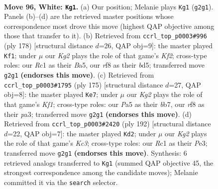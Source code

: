 \documentclass[11pt]{article}
\begin{document}
\clearpage

\begin{figure}[p]\centering
\begin{subfigure}{0.46\textwidth}\centering
\resizebox{\linewidth}{!}{%
\newchessgame
\chessboard[
  setfen={5r2/8/p7/P1pk1p1p/1p3P1P/4P1P1/1P4K1/2R5 w - - 3 96},
  showmover=false,
  pgfstyle=straightmove, color=movearrow, markmove={g2-g1}
]}
\caption{}
\end{subfigure}\hfill
\begin{subfigure}{0.46\textwidth}\centering
\resizebox{\linewidth}{!}{%
\newchessgame
\chessboard[
  setfen={8/4k3/5p2/B2b1Pp1/3Pp1Pp/4P2P/5K2/8 w - - 64 90},
  showmover=false,
  pgfstyle=straightmove, color=movearrow, markmove={f2-f1}
]}
\caption{}
\end{subfigure}
\\[4pt]
\begin{subfigure}{0.46\textwidth}\centering
\resizebox{\linewidth}{!}{%
\newchessgame
\chessboard[
  setfen={5k2/pB3p2/1p4p1/7p/1P3P1P/P5Pb/5K2/8 b - - 4 88},
  showmover=false,
  pgfstyle=straightmove, color=movearrow, markmove={f8-e7}
]}
\caption{}
\end{subfigure}\hfill
\begin{subfigure}{0.46\textwidth}\centering
\resizebox{\linewidth}{!}{%
\newchessgame
\chessboard[
  setfen={8/8/1p2k3/1P3p1p/3Pp1pP/2K1P1P1/5P2/8 w - - 18 97},
  showmover=false,
  pgfstyle=straightmove, color=movearrow, markmove={c3-d2}
]}
\caption{}
\end{subfigure}
\caption{\textbf{Move 96, White: \texttt{Kg1}.} (a) Our position; Melanie plays \texttt{Kg1} (\texttt{g2g1}). Panels (b)--(d) are the retrieved master positions whose correspondence most drove this move (highest QAP objective among those that transfer to it). (b) Retrieved from \texttt{ccrl\_top\_p0003\#996} (ply 178) [structural distance $d$=26, QAP obj=9]: the master played \texttt{Kf1}; under $\mu$ our \emph{Kg2} plays the role of that game's \emph{Kf2}; cross-type roles: our \emph{R}c1 as their \emph{B}a5, our \emph{r}f8 as their \emph{b}d5; transferred move \texttt{g2g1} \textbf{(endorses this move)}. (c) Retrieved from \texttt{ccrl\_top\_p0003\#1795} (ply 175) [structural distance $d$=27, QAP obj=8]: the master played \texttt{Ke7}; under $\mu$ our \emph{Kg2} plays the role of that game's \emph{Kf1}; cross-type roles: our \emph{P}a5 as their \emph{b}b7, our \emph{r}f8 as their \emph{p}a3; transferred move \texttt{g2g1} \textbf{(endorses this move)}. (d) Retrieved from \texttt{ccrl\_top\_p0003\#2420} (ply 192) [structural distance $d$=22, QAP obj=7]: the master played \texttt{Kd2}; under $\mu$ our \emph{Kg2} plays the role of that game's \emph{Kc3}; cross-type roles: our \emph{R}c1 as their \emph{P}e3; transferred move \texttt{g2g1} \textbf{(endorses this move)}. Synthesis: 6 retrieved analogs transferred to \texttt{Kg1} (summed QAP objective 45, the strongest correspondence among the candidate moves); Melanie committed it via the \texttt{search} selector.}
\label{fig:thought-m190}
\end{figure}
\end{document}
